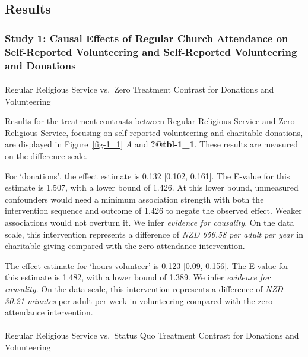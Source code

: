 \documentclass[
  single column]{article}
\makeatletter
\let\oldparagraph\paragraph
\renewcommand{\paragraph}{
    \@ifstar
      \xxxParagraphStar
      \xxxParagraphNoStar
  }
\newcommand{\xxxParagraphStar}[1]{\oldparagraph*{#1}\mbox{}}
\newcommand{\xxxParagraphNoStar}[1]{\oldparagraph{#1}\mbox{}}
\makeatother
\begin{document}
\newpage{}

\subsection{Results}\label{results}

\subsubsection{Study 1: Causal Effects of Regular Church Attendance on
Self-Reported Volunteering and Self-Reported Volunteering and
Donations}\label{study-1-causal-effects-of-regular-church-attendance-on-self-reported-volunteering-and-self-reported-volunteering-and-donations}

\paragraph{Regular Religious Service vs.~Zero Treatment Contrast for
Donations and
Volunteering}\label{regular-religious-service-vs.-zero-treatment-contrast-for-donations-and-volunteering}

Results for the treatment contrasts between Regular Religious Service
and Zero Religious Service, focusing on self-reported volunteering and
charitable donations, are displayed in Figure~\ref{fig-1_1} \emph{A} and
\textbf{?@tbl-1\_1}. These results are measured on the difference scale.

For `donations', the effect estimate is 0.132 {[}0.102, 0.161{]}. The
E-value for this estimate is 1.507, with a lower bound of 1.426. At this
lower bound, unmeasured confounders would need a minimum association
strength with both the intervention sequence and outcome of 1.426 to
negate the observed effect. Weaker associations would not overturn it.
We infer \emph{evidence for causality}. On the data scale, this
intervention represents a difference of \emph{NZD 656.58 per adult per
year} in charitable giving compared with the zero attendance
intervention.

The effect estimate for `hours volunteer' is 0.123 {[}0.09, 0.156{]}.
The E-value for this estimate is 1.482, with a lower bound of 1.389. We
infer \emph{evidence for causality}. On the data scale, this
intervention represents a difference of \emph{NZD 30.21 minutes} per
adult per week in volunteering compared with the zero attendance
intervention.

\paragraph{Regular Religious Service vs.~Status Quo Treatment Contrast
for Donations and
Volunteering}\label{regular-religious-service-vs.-status-quo-treatment-contrast-for-donations-and-volunteering}
\end{document}
